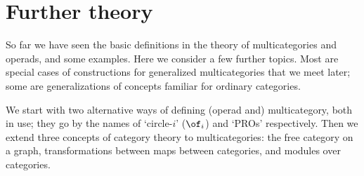 \section{Further theory}


So far we have seen the basic definitions in the theory of multicategories
and operads, and some examples.  Here we consider a few further topics.
Most are special cases of constructions for generalized multicategories
that we meet later; some are generalizations of concepts familiar for
ordinary categories.

We start with two alternative ways of defining (operad and) multicategory,
both in use; they go by the names of `circle-$i$' ($\of_i$) and `PROs'
respectively.  Then we extend three concepts of category theory to
multicategories: the free category on a graph, transformations between maps
between categories, and modules over categories.

%
%
%
%
%

